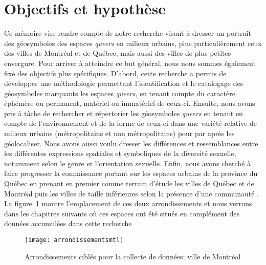 \section*{Objectifs et hypothèse}
Ce mémoire vise rendre compte de notre recherche visant à dresser un portrait des géosymboles des espaces \emph{queers} en milieux urbains, plus particulièrement ceux des villes de Montréal et de Québec, mais aussi des villes de plus petites envergure.
Pour arriver à atteindre ce but général, nous nous sommes également fixé des objectifs plus spécifiques.
D'abord, cette recherche a permis de développer une méthodologie permettant l'identification et le catalogage des géosymboles marquants les espaces \emph{queers}, en tenant compte du caractère éphémère ou permanent, matériel ou immatériel de ceux-ci.
Ensuite, nous avons pris à tâche de rechercher et répertorier les géosymboles \emph{queers} en tenant en compte de l'environnement et de la forme de ceux-ci dans une variété relative de milieux urbains (métropolitains et non métropolitains) pour par après les géolocaliser.
Nous avons aussi voulu dresser les différences et ressemblances entre les différentes expressions spatiales et symboliques de la diversité sexuelle, notamment selon le genre et l'orientation sexuelle.
Enfin, nous avons cherché à faire progresser la connaissance portant sur les espaces \lgbt{} urbains de la province du Québec en prenant en premier comme terrain d'étude les villes de Québec et de Montréal puis les villes de taille inférieures selon la présence d'une communauté \lgbt{}.
La figure~\ref{fig:arrondissementsmtl} montre l'emplacement de ces deux arrondissements et nous verrons dans les chapitres suivants où ces espaces ont été situés en complément des données accumulées dans cette recherche 

\begin{figure}[ht]
 \centering
 \texttt{[image: arrondissementsmtl]}
 \caption[Arrondissements ciblés: ville de Montréal]{Arrondissements ciblés pour la collecte de données: ville de Montréal}\label{fig:arrondissementsmtl}
\end{figure}


